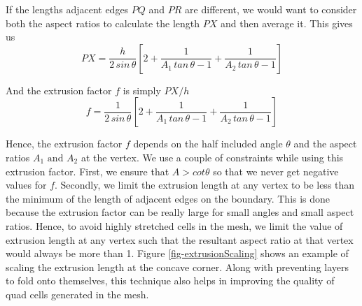 \documentclass[conf]{new-aiaa}
\begin{document}
If the lengths adjacent edges $PQ$ and $PR$ are different, we would want to consider both the aspect ratios to calculate the length $PX$ and then average it. This gives us
\begin{equation}
    PX = \dfrac{h}{2 \, sin\, \theta} \left[ 2 + \dfrac{1}{A_1\, tan \, \theta - 1} + \dfrac{1}{A_2\, tan \, \theta - 1} \right]
\end{equation}

And the extrusion factor $f$ is simply $PX/h$
\begin{equation}
    f = \dfrac{1}{2 \, sin \, \theta} \left[ 2 + \dfrac{1}{A_1\, tan \, \theta - 1} + \dfrac{1}{A_2\, tan \, \theta - 1} \right]
\end{equation}

Hence, the extrusion factor $f$ depends on the half included angle $\theta$ and the aspect ratios $A_1 \text{ and } A_2$ at the vertex. We use a couple of constraints while using this extrusion factor. First, we ensure that $A > cot \theta$ so that we never get negative values for $f$. Secondly, we limit the extrusion length at any vertex to be less than the minimum of the length of adjacent edges on the boundary. This is done because the extrusion factor can be  really large for small angles and small aspect ratios. Hence, to avoid highly stretched cells in the mesh, we limit the value of extrusion length at any vertex such that the resultant aspect ratio at that vertex would always be more than 1. Figure \ref{fig-extrusionScaling} shows an example of scaling the extrusion length at the concave corner. Along with preventing layers to fold onto themselves, this technique also helps in improving the quality of quad cells generated in the mesh.

\end{document}
